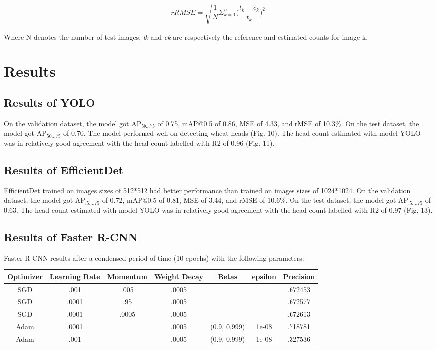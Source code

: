 \documentclass[utf8]{frontiersSCNS} %
\begin{document}
\begin{equation}
rRMSE = \sqrt{\frac{1}{N}\Sigma_{k=1}^{n}{\Big(\frac{t_k-c_k}{t_k}\Big)^2}}
\end{equation}

Where N denotes the number of test images, \emph{tk} and \emph{ck} are respectively the reference and estimated counts for image k.

\section{Results}
\subsection{Results of YOLO}

On the validation dataset, the model got AP$_{50...75}$ of 0.75, mAP@0.5 of 0.86, MSE of 4.33, and rMSE of 10.3\%. On the test dataset, the model got AP$_{50...75}$ of 0.70. The model performed well on detecting wheat heads (Fig. 10). The head count estimated with model YOLO was in relatively good agreement with the head count labelled with R2 of 0.96 (Fig. 11).

\subsection{Results of EfficientDet}
EfficientDet trained on images sizes of 512*512 had better performance than trained on images sizes of 1024*1024. On the validation dataset, the model got AP$_{.5....75}$ of 0.72, mAP@0.5 of 0.81, MSE of 3.44, and rMSE of 10.6\%. On the test dataset, the model got AP$_{.5....75}$ of 0.63. The head count estimated with model YOLO was in relatively good agreement with the head count labelled with R2 of 0.97 (Fig. 13).

\subsection{Results of Faster R-CNN}
Faster R-CNN results after a condensed period of time (10 epochs) with the following parameters:

\begin{center}
\begin{tabular}{||c c c c c c c||} 
\hline
Optimizer & Learning Rate & Momentum & Weight Decay & Betas & epsilon & Precision\\
\hline\hline
SGD & .001 & .005 & .0005 & & & .672453 \\ 
\hline
SGD & .0001 & .95 & .0005 & & & .672577 \\ 
\hline
SGD & .0001 & .0005 & .0005 & & & .672613 \\ 
\hline
Adam & .0001 &  & .0005 & (0.9, 0.999) & 1e-08 & .718781 \\ 
\hline
Adam & .001 &  & .0005 & (0.9, 0.999) & 1e-08 & .327536 \\ 
\hline
\end{tabular}
\end{center}
\end{document}
